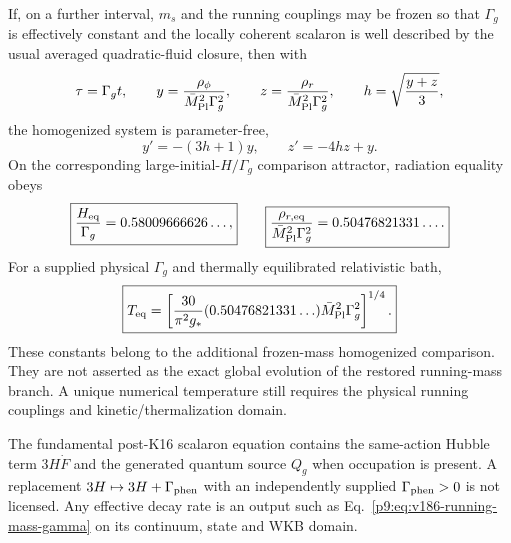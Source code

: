 \documentclass[12pt,a4paper]{article}
\begin{document}
\begin{corollary}
\label{p9:cor:v181-kin16-universal-equality}
If, on a further interval, $m_s$ and the running couplings may be frozen so
that $\Gamma_g$ is effectively constant and the locally coherent scalaron is
well described by the usual averaged quadratic-fluid closure, then with
\[
 \tau=\Gamma_gt,\qquad
 y=\frac{\rho_\phi}{\bar M_{\rm Pl}^2\Gamma_g^2},\qquad
 z=\frac{\rho_r}{\bar M_{\rm Pl}^2\Gamma_g^2},\qquad
 h=\sqrt{\frac{y+z}{3}},
\]
the homogenized system is parameter-free,
\[
 y'=-(3h+1)y,\qquad z'=-4hz+y.
\]
On the corresponding large-initial-$H/\Gamma_g$ comparison attractor, radiation equality obeys
\[
 \boxed{\frac{H_{\rm eq}}{\Gamma_g}=0.58009666626\ldots,}
 \qquad
 \boxed{\frac{\rho_{r,{\rm eq}}}
 {\bar M_{\rm Pl}^2\Gamma_g^2}=0.50476821331\ldots.}
\]
For a supplied physical \(\Gamma_g\) and thermally equilibrated relativistic
bath,
\[
 \boxed{T_{\rm eq}=
 \left[\frac{30}{\pi^2g_*}(0.50476821331\ldots)
 \bar M_{\rm Pl}^2\Gamma_g^2\right]^{1/4}.}
\]
These constants belong to the additional frozen-mass homogenized comparison.  They are not asserted as the exact global evolution of the restored running-mass branch.  A unique numerical temperature still requires the physical running couplings and kinetic/thermalization domain.
\end{corollary}

\begin{corollary}
\label{p9:cor:v186-no-inserted-k16-damping}
The fundamental post-K16 scalaron equation contains the same-action Hubble
term $3H\dot F$ and the generated quantum source $Q_g$ when occupation is
present.  A replacement $3H\mapsto3H+\Gamma_{\rm phen}$ with an independently
supplied $\Gamma_{\rm phen}>0$ is not licensed.  Any effective decay rate is
an output such as Eq.~\eqref{p9:eq:v186-running-mass-gamma} on its continuum,
state and WKB domain.
\end{corollary}
\end{document}
